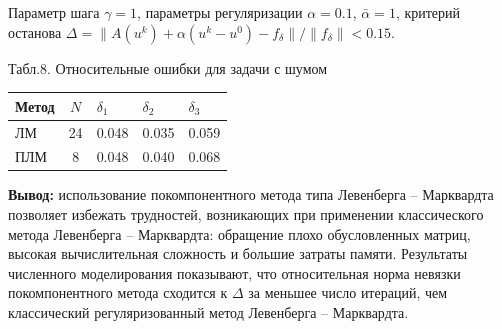 \documentclass[10pt,pdf, mathserif, hyperref={unicode}]{beamer}
\begin{document}
\begin{frame}{}
	Параметр шага $\gamma=1$, параметры регуляризации $\alpha=0.1$, $\bar{\alpha}=1$, критерий останова $\Delta=\|A(u^k)+\alpha(u^k-u^0)-f_\delta\|/\|f_\delta\|<0.15$.
	\begin{table}[H]
		\centering
		{\scriptsize Табл.8. Относительные ошибки для задачи с шумом}
		\begin{tabular}{|l|c|l|l|l|}
			\hline
			\textbf{Метод} & \textbf{$N$} & \textbf{$\delta_1$} & \textbf{$\delta_2$} & \textbf{$\delta_3$} \\ \hline
			ЛМ                                                    & 24                            & 0.048                                & 0.035                                & 0.059                                \\ \hline
			ПЛМ                                                   & 8                             & 0.048                                & 0.040                                & 0.068                                \\ \hline
		\end{tabular}
	\end{table}
	\textbf{\color{blue}Вывод:} использование
	покомпонентного метода типа Левенберга – Марквардта позволяет избежать трудностей, возникающих при применении классического метода Левенберга – Марквардта: обращение плохо обусловленных матриц, высокая вычислительная сложность и большие затраты памяти. Результаты численного моделирования показывают, что относительная норма невязки покомпонентного метода сходится
	к $\Delta$ за меньшее число итераций, чем классический регуляризованный метод Левенберга – Марквардта.
\end{frame}
\end{document}
